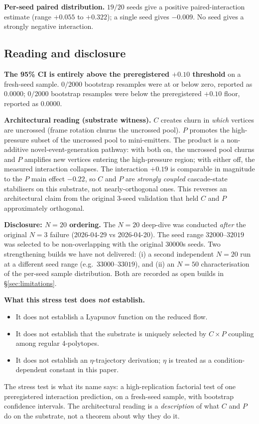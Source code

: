 \textbf{Per-seed paired distribution.}
$19/20$ seeds give a positive paired-interaction estimate (range
$+0.055$ to $+0.322$); a single seed gives $-0.009$. No seed gives a
strongly negative interaction.

\subsection{Reading and disclosure}

\textbf{The 95\% CI is entirely above the preregistered $+0.10$
threshold} on a fresh-seed sample. $0/2000$ bootstrap resamples were
at or below zero, reported as $0.0000$; $0/2000$ bootstrap resamples
were below the preregistered $+0.10$ floor, reported as $0.0000$.

\textbf{Architectural reading (substrate witness).} $C$ creates churn
in \emph{which} vertices are uncrossed (frame rotation churns the
uncrossed pool). $P$ promotes the high-pressure subset of the
uncrossed pool to mini-emitters. The product is a non-additive
novel-event-generation pathway: with both on, the uncrossed pool
churns and $P$ amplifies new vertices entering the high-pressure
region; with either off, the measured interaction collapses. The interaction
$+0.19$ is comparable in magnitude to the $P$ main effect $-0.22$,
so $C$ and $P$ are \emph{strongly coupled} cascade-state stabilisers
on this substrate, not nearly-orthogonal ones. This reverses an
architectural claim from the original 3-seed validation that held $C$
and $P$ approximately orthogonal.

\textbf{Disclosure: $N\!=\!20$ ordering.} The $N\!=\!20$ deep-dive
was conducted \emph{after} the original $N\!=\!3$ failure
(2026-04-29 vs 2026-04-20). The seed range $32000$--$32019$ was
selected to be non-overlapping with the original $30000$s seeds.
Two strengthening builds we have not delivered:
(i) a second independent $N\!=\!20$ run at a different seed range
(e.g.\ $33000$--$33019$), and
(ii) an $N\!=\!50$ characterisation of the per-seed sample
distribution. Both are recorded as open builds in
\S\ref{sec:limitations}.

\textbf{What this stress test does \emph{not} establish.}
\begin{itemize}\itemsep=2pt
\item It does not establish a Lyapunov function on the reduced flow.
\item It does not establish that the substrate is uniquely selected by
  $C\times P$ coupling among regular 4-polytopes.
\item It does not establish an $\eta$-trajectory derivation; $\eta$
  is treated as a condition-dependent constant in this paper.
\end{itemize}
The stress test is what its name says: a high-replication factorial
test of one preregistered interaction prediction, on a fresh-seed
sample, with bootstrap confidence intervals. The architectural reading
is a \emph{description} of what $C$ and $P$ do on the substrate, not a
theorem about why they do it.

